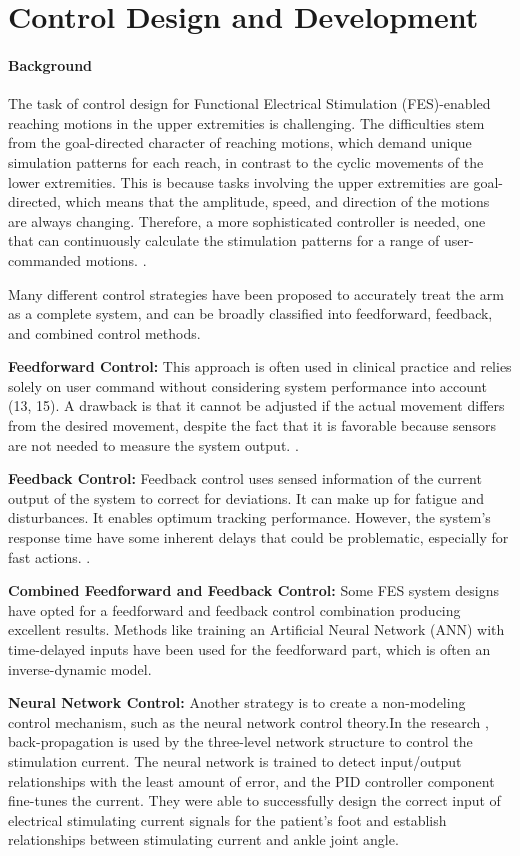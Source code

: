 \chapter{Control Design and Development}

\subsubsection{Background}
The task of control design for Functional Electrical Stimulation (FES)-enabled reaching motions in the upper extremities is challenging. The difficulties stem from the goal-directed character of reaching motions, which demand unique simulation patterns for each reach, in contrast to the cyclic movements of the lower extremities. This is because tasks involving the upper extremities are goal-directed, which means that the amplitude, speed, and direction of the motions are always changing. Therefore, a more sophisticated controller is needed, one that can continuously calculate the stimulation patterns for a range of user-commanded motions. \cite{CFF}.

Many different control strategies have been proposed to accurately treat the arm as a complete system, and can be broadly classified into feedforward, feedback, and combined control methods.

\textbf{Feedforward Control:} This approach is often used in clinical practice and relies solely on user command without considering system performance into account (13, 15). A drawback is that it cannot be adjusted if the actual movement differs from the desired movement, despite the fact that it is favorable because sensors are not needed to measure the system output.  \cite{CFF}.

\textbf{Feedback Control:} Feedback control uses sensed information of the current output of the system to correct for deviations. It can make up for fatigue and disturbances. It enables optimum tracking performance. However, the system's response time have some inherent delays that could be problematic, especially for fast actions. \cite{CFF}.

\textbf{Combined Feedforward and Feedback Control:} Some FES system designs have opted for a feedforward and feedback control combination producing excellent results. Methods like training an Artificial Neural Network (ANN) with time-delayed inputs have been used for the feedforward part, which is often an inverse-dynamic model.

\textbf{Neural Network Control:} Another strategy is to create a non-modeling control mechanism, such as the neural network control theory.In the research \cite{NNPID}, back-propagation is used by the three-level network structure to control the stimulation current. The neural network is trained to detect input/output relationships with the least amount of error, and the PID controller component fine-tunes the current. They were able to successfully design the correct input of electrical stimulating current signals for the patient's foot and establish relationships between stimulating current and ankle joint angle.

